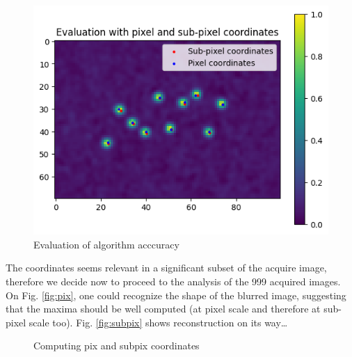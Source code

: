 \documentclass[10pt,letterpaper]{article}
\begin{document}
\begin{figure}[h]
	\centering
	\includegraphics[scale=0.65]{evaluation of algo.png}
	\caption{Evaluation of algorithm acccuracy}
	\label{fig:eval}
\end{figure}

The coordinates seems relevant in a significant subset of the acquire image, therefore we decide now to proceed to the analysis of the 999 acquired images. On Fig. \ref{fig:pix}, one could recognize the shape of the blurred image, suggesting that the maxima should be well computed (at pixel scale and therefore at sub-pixel scale too). Fig. \ref{fig:subpix} shows reconstruction on its way\dots

\begin{figure}[h]
     \centering
     \caption{Computing pix and subpix coordinates}
\end{figure}
\end{document}
